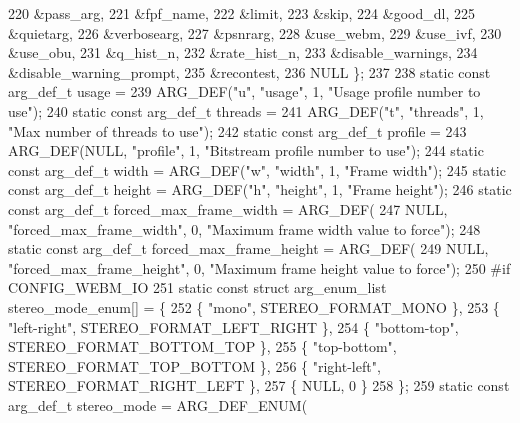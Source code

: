 \begin{DoxyCodeInclude}
{{220     &pass\_arg,
221     &fpf\_name,
222     &limit,
223     &skip,
224     &good\_dl,
225     &quietarg,
226     &verbosearg,
227     &psnrarg,
228     &use\_webm,
229     &use\_ivf,
230     &use\_obu,
231     &q\_hist\_n,
232     &rate\_hist\_n,
233     &disable\_warnings,
234     &disable\_warning\_prompt,
235     &recontest,
236     NULL \};
237 
238 \textcolor{keyword}{static} \textcolor{keyword}{const} arg\_def\_t usage =
239     ARG\_DEF(\textcolor{stringliteral}{"u"}, \textcolor{stringliteral}{"usage"}, 1, \textcolor{stringliteral}{"Usage profile number to use"});
240 \textcolor{keyword}{static} \textcolor{keyword}{const} arg\_def\_t threads =
241     ARG\_DEF(\textcolor{stringliteral}{"t"}, \textcolor{stringliteral}{"threads"}, 1, \textcolor{stringliteral}{"Max number of threads to use"});
242 \textcolor{keyword}{static} \textcolor{keyword}{const} arg\_def\_t profile =
243     ARG\_DEF(NULL, \textcolor{stringliteral}{"profile"}, 1, \textcolor{stringliteral}{"Bitstream profile number to use"});
244 \textcolor{keyword}{static} \textcolor{keyword}{const} arg\_def\_t width = ARG\_DEF(\textcolor{stringliteral}{"w"}, \textcolor{stringliteral}{"width"}, 1, \textcolor{stringliteral}{"Frame width"});
245 \textcolor{keyword}{static} \textcolor{keyword}{const} arg\_def\_t height = ARG\_DEF(\textcolor{stringliteral}{"h"}, \textcolor{stringliteral}{"height"}, 1, \textcolor{stringliteral}{"Frame height"});
246 \textcolor{keyword}{static} \textcolor{keyword}{const} arg\_def\_t forced\_max\_frame\_width = ARG\_DEF(
247     NULL, \textcolor{stringliteral}{"forced\_max\_frame\_width"}, 0, \textcolor{stringliteral}{"Maximum frame width value to force"});
248 \textcolor{keyword}{static} \textcolor{keyword}{const} arg\_def\_t forced\_max\_frame\_height = ARG\_DEF(
249     NULL, \textcolor{stringliteral}{"forced\_max\_frame\_height"}, 0, \textcolor{stringliteral}{"Maximum frame height value to force"});
250 \textcolor{preprocessor}{#if CONFIG\_WEBM\_IO}
251 \textcolor{keyword}{static} \textcolor{keyword}{const} \textcolor{keyword}{struct }arg\_enum\_list stereo\_mode\_enum[] = \{
252     \{ \textcolor{stringliteral}{"mono"}, STEREO\_FORMAT\_MONO \},
253     \{ \textcolor{stringliteral}{"left-right"}, STEREO\_FORMAT\_LEFT\_RIGHT \},
254     \{ \textcolor{stringliteral}{"bottom-top"}, STEREO\_FORMAT\_BOTTOM\_TOP \},
255     \{ \textcolor{stringliteral}{"top-bottom"}, STEREO\_FORMAT\_TOP\_BOTTOM \},
256     \{ \textcolor{stringliteral}{"right-left"}, STEREO\_FORMAT\_RIGHT\_LEFT \},
257     \{ NULL, 0 \}
258 \};
259 \textcolor{keyword}{static} \textcolor{keyword}{const} arg\_def\_t stereo\_mode = ARG\_DEF\_ENUM(
}}
\end{DoxyCodeInclude}
